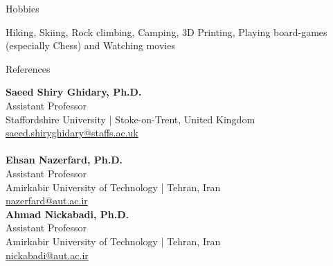 \documentclass{resume} %
\begin{document}
\pagebreak

\begin{rSection}{Hobbies}

Hiking, Skiing, Rock climbing, Camping, 3D Printing, Playing board-games (especially Chess) and Watching movies
\\



\end{rSection}


\begin{rSection}{References}

\begin{multicols}{3}
\textbf{Saeed Shiry Ghidary, Ph.D.}\\
Assistant Professor\\
Staffordshire University | Stoke-on-Trent, United Kingdom\\
\href{mailto:saeed.shiryghidary@staffs.ac.uk}{saeed.shiryghidary@staffs.ac.uk}
\\
\\
\textbf{Ehsan Nazerfard, Ph.D.}\\
Assistant Professor\\
Amirkabir University of Technology | Tehran, Iran\\
\href{mailto:nazerfard@aut.ac.ir}{nazerfard@aut.ac.ir}
\\

\textbf{Ahmad Nickabadi, Ph.D.}\\
Assistant Professor\\
Amirkabir University of Technology | Tehran, Iran\\
\href{mailto:nickabadi@aut.ac.ir}{nickabadi@aut.ac.ir}
\\
\end{multicols}

\end{rSection}
\end{document}
